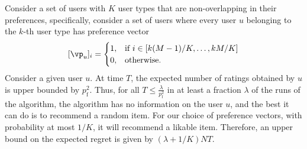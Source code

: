 \documentclass{article}
\newcommand\pf{p_{\mathrm{f}}}
\begin{document}
Consider a set of users with $K$ user types that are non-overlapping in their preferences, specifically, 
consider a set of users where every user $u$ belonging to the $k$-th user type has preference vector
\[
[\vp_u]_{i}
=
\begin{cases}
1, & \text{if } i \in [ k(M-1)/K, \ldots,  k M/K ] \\
0, & \text{otherwise}.
\end{cases}
\]
Consider a given user $u$. 
At time $T$, the expected number of ratings obtained by $u$ is upper bounded by $\pf^2$. %
Thus, for all $T \leq \frac{\lambda}{\pf^2}$ in at least a fraction $\lambda$ of the runs of the algorithm, the algorithm has no information on the user $u$, and the best it can do is to recommend a random item. For our choice of preference vectors, 
with probability at most $1/K$, it will recommend a likable item. 
Therefore, an upper bound on the expected regret is given by $(\lambda + 1/K) NT$. 




\end{document}
